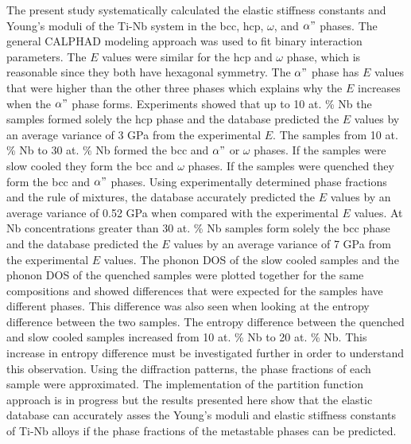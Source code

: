 The present study systematically calculated the elastic stiffness constants and Young's moduli of the Ti-Nb system in the bcc, hcp, $\omega$, and $\alpha"$ phases. The general CALPHAD modeling approach was used to fit binary interaction parameters. The $E$ values were similar for the hcp and $\omega$ phase, which is reasonable since they both have hexagonal symmetry. The $\alpha"$ phase has $E$ values that were higher than the other three phases which explains why the $E$ increases when the $\alpha"$ phase forms. Experiments showed that up to 10 at. \% Nb the samples formed solely the hcp phase and the database predicted the $E$ values by an average variance of 3 GPa from the experimental $E$. The samples from 10 at. \% Nb to 30 at. \% Nb formed the bcc and $\alpha"$ or $\omega$ phases. If the samples were slow cooled they form the bcc and $\omega$ phases. If the samples were quenched they form the bcc and $\alpha"$ phases. Using experimentally determined phase fractions and the rule of mixtures, the database accurately predicted the $E$ values by an average variance of 0.52 GPa when compared with the experimental $E$ values. At Nb concentrations greater than 30 at. \% Nb samples form solely the bcc phase and the database predicted the $E$ values by an average variance of 7 GPa from the experimental $E$ values. The phonon DOS of the slow cooled samples and the phonon DOS of the quenched samples were plotted together for the same compositions and showed differences that were expected for the samples have different phases. This difference was also seen when looking at the entropy difference between the two samples. The entropy difference between the quenched and slow cooled samples increased from 10 at. \% Nb to 20 at. \% Nb. This increase in entropy difference must be investigated further in order to understand this observation. Using the diffraction patterns, the phase fractions of each sample were approximated. The implementation of the partition function approach is in progress but the results presented here show that the elastic database can accurately asses the Young's moduli and elastic stiffness constants of Ti-Nb alloys if the phase fractions of the metastable phases can be predicted.

